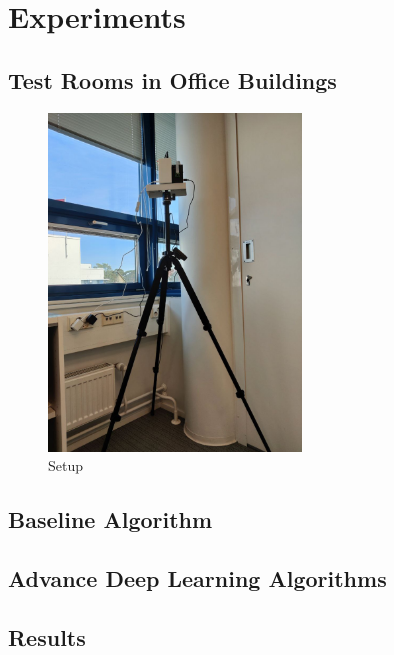 \chapter{Experiments}
\label{chapter:methods}
\section{Test Rooms in Office Buildings}
\begin{figure}[ht]
  \begin{center}
    \includegraphics[width=0.6\textwidth]{Master's thesis/images/setup.jpg} 
    \caption{Setup}
    \label{fig:AoA}
  \end{center}
\end{figure}  
\section{Baseline Algorithm}
\label{section:environments}

\section{Advance Deep Learning Algorithms}
\label{section:environments}

\section{Results}